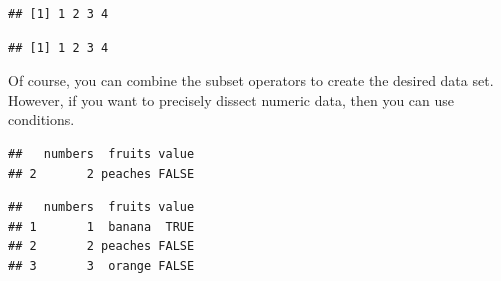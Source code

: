 \documentclass[]{report}
\newenvironment{Shaded}{\begin{snugshade}}{\end{snugshade}}
\newcommand{\KeywordTok}[1]{\textcolor[rgb]{0.13,0.29,0.53}{\textbf{#1}}}
\newcommand{\DataTypeTok}[1]{\textcolor[rgb]{0.13,0.29,0.53}{#1}}
\newcommand{\DecValTok}[1]{\textcolor[rgb]{0.00,0.00,0.81}{#1}}
\newcommand{\StringTok}[1]{\textcolor[rgb]{0.31,0.60,0.02}{#1}}
\newcommand{\CommentTok}[1]{\textcolor[rgb]{0.56,0.35,0.01}{\textit{#1}}}
\newcommand{\OperatorTok}[1]{\textcolor[rgb]{0.81,0.36,0.00}{\textbf{#1}}}
\newcommand{\NormalTok}[1]{#1}
\begin{document}
\begin{verbatim}
## [1] 1 2 3 4
\end{verbatim}

\begin{Shaded}
\end{Shaded}

\begin{verbatim}
## [1] 1 2 3 4
\end{verbatim}

Of course, you can combine the subset operators to create the desired
data set. However, if you want to precisely dissect numeric data, then
you can use conditions.

\begin{Shaded}
\end{Shaded}

\begin{verbatim}
##   numbers  fruits value
## 2       2 peaches FALSE
\end{verbatim}

\begin{Shaded}
\end{Shaded}

\begin{verbatim}
##   numbers  fruits value
## 1       1  banana  TRUE
## 2       2 peaches FALSE
## 3       3  orange FALSE
\end{verbatim}
\end{document}
